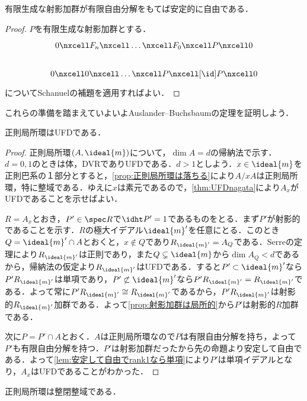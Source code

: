\begin{prop}
	有限生成な射影加群が有限自由分解をもてば安定的に自由である．
\end{prop}

\begin{proof}
	$P$を有限生成な射影加群とする．
	\[\begin{tikzcd}
		0\nxcell F_n\nxcell\dots\nxcell F_0\nxcell P\nxcell0\\
		0\nxcell 0\nxcell\dots\nxcell P\nxcell[\id] P\nxcell0
	\end{tikzcd}\]	
	についてSchanuelの補題を適用すればよい．
\end{proof}

これらの準備を踏まえていよいよAuslander--Buchsbaumの定理を証明しよう．
\begin{thm}\label{thm:Auslander--Buchsbaumの定理}
	正則局所環はUFDである．
\end{thm}

\begin{proof}
	正則局所環$(A,\ideal{m})$について，$\dim A=d$の帰納法で示す．$d=0,1$のときは体，DVRでありUFDである．$d>1$としよう．$x\in \ideal{m}$を正則巴系の１部分とすると，\ref{prop:正則局所環は落ちる}により$A/xA$は正則局所環，特に整域である．ゆえに$x$は素元であるので，\ref{thm:UFDnagata}により$A_x$がUFDであることを示せばよい．
	
	$R=A_x$とおき，$P'\in\spec R$で$\idht P'=1$であるものをとる．まず$P'$が射影的であることを示す．$R$の極大イデアル$\ideal{m}'$を任意にとる．このとき$Q=\ideal{m}'\cap A$とおくと，$x\not\in Q$であり$R_{\ideal{m}'}=A_Q$である．Serreの定理により$R_{\ideal{m}'}$は正則であり，また$Q\subsetneq\ideal{m}$から$\dim A_Q<d$であるから，帰納法の仮定より$R_{\ideal{m}'}$はUFDである．すると$P'\subset\ideal{m}'$なら$P'R_{\ideal{m}'}$は単項であり，$P'\not\subset\ideal{m}'$なら$P'R_{\ideal{m}'}=R_{\ideal{m}'}$である．よって常に$P'R_{\ideal{m}'}\cong R_{\ideal{m}'}$であるから，$P'R_{\ideal{m}'}$は射影的$R_{\ideal{m}'}$加群である．よって\ref{prop:射影加群は局所的}から$P'$は射影的$R$加群である．
	
	次に$P=P'\cap A$とおく．$A$は正則局所環なので$P$は有限自由分解を持ち，よって$P'$も有限自由分解を持つ．$P'$は射影加群だったから先の命題より安定して自由である．よって\ref{lem:安定して自由でrank1なら単項}により$P'$は単項イデアルとなり，$A_x$はUFDであることがわかった．
\end{proof}

\begin{cor}
	正則局所環は整閉整域である．
\end{cor}

